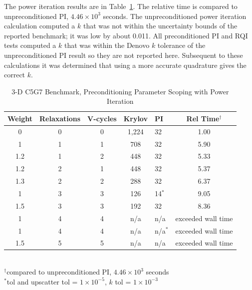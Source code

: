 The power iteration results are in Table~\ref{table:3-D c5g7}. The relative time is compared to unpreconditioned PI, $4.46 \times 10^{3}$ seconds. The unpreconditioned power iteration calculation computed a $k$ that was not within the uncertainty bounds of the reported benchmark; it was low by about 0.011. All preconditioned PI and RQI tests computed a $k$ that was within the Denovo $k$ tolerance of the unpreconditioned PI result so they are not reported here. Subsequent to these calculations it was determined that using a more accurate quadrature gives the correct $k$. 
%
\begin{table}[!h]
\caption{3-D C5G7 Benchmark, Preconditioning Parameter Scoping with Power Iteration}
\begin{center}
\begin{tabular}{| c | c | c | c | l | c |}
\hline
Weight & Relaxations & V-cycles & Krylov & PI & Rel Time$^{\dag}$ \\[0.5ex]
\hline
0    & 0 & 0 & 1,224 & 32 & 1.00 \\ %
1    & 1 & 1 & 708    & 32 & 5.90 \\ %
1.2 & 1 & 2 & 448    & 32 & 5.33 \\ %
1.2 & 2 & 1 & 448    & 32 & 5.37 \\ %
1.3 & 2 & 2 & 288    & 32 & 6.37 \\ %
1    & 3 & 3 & 126    & 14$^{*}$  & 9.05 \\ %
1.5 & 3 & 3 & 192    & 32 & 8.36 \\ %
1    & 4 & 4 & n/a     & n/a          & exceeded wall time \\
1    & 4 & 4 & n/a     & n/a$^{*}$ & exceeded wall time \\
1.5 & 5 & 5 & n/a     & n/a          & exceeded wall time \\
\hline 
\end{tabular}\\
$^{\dag}$compared to unpreconditioned PI, $4.46 \times 10^{3}$ seconds\\
$^{*}$tol and upscatter tol = $1 \times 10^{-5}$, $k$ tol = $1 \times 10^{-3}$
\end{center}
\label{table:3-D c5g7}
\end{table}

